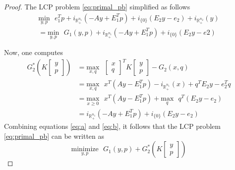 \documentclass{article} %
\begin{document}
\begin{proof}
  The LCP problem \eqref{eq:primal_pb} simplified as follows
\begin{equation}
  \begin{aligned}
    \underset{y,p}{\text{min}}\text{ }e_1^Tp + i_{\mathbb{R}^{n_1}_+}(-Ay + E_1^Tp) + i_{\{0\}}(E_2y - e_2) + i_{\mathbb{R}^{n_2}_+}(y)\\
    = \underset{y,p}{\text{min}}\text{ }G_1(y,p) + i_{\mathbb{R}^{n_1}_+}(-Ay + E_1^Tp) + i_{\{0\}}(E_2y - e2)
  \end{aligned}
  \label{eq:a}
\end{equation}

Now, one computes
\begin{equation}
  \begin{split}
    G_2^*\left(K\begin{bmatrix}y\\p\end{bmatrix}\right) &= \underset{x,q}{\text{max}}\text{ }\begin{bmatrix}x\\q\end{bmatrix}^TK\begin{bmatrix}y\\p\end{bmatrix} - G_2(x, q) \\
      &= \underset{x, q}{\text{max}}\text{ }x^T(Ay - E_1^Tp) - i_{\mathbb{R}^{n_1}_+}(x) + q^TE_2y - e_2^Tq\\
      &= \underset{x \geq 0}{\text{max}}\text{ }x^T(Ay - E_1^Tp) + \underset{q}{\text{max}}\text{ }q^T(E_2y - e_2)\\
      &= i_{\mathbb{R}^{n_1}_+}(-Ay + E_1^Tp) + i_{\{0\}}(E_2y - e_2)
  \end{split}
  \label{eq:b}
\end{equation}
Combining equations \eqref{eq:a} and \eqref{eq:b}, it follows that the LCP problem \eqref{eq:primal_pb} can be written as 
\begin{equation}
  \underset{y,p}{\text{minimize}}\text{ }G_1(y,p) + G_2^*\left(K\begin{bmatrix}y\\p\end{bmatrix}\right)
\end{equation}


\end{proof}
\end{document}
